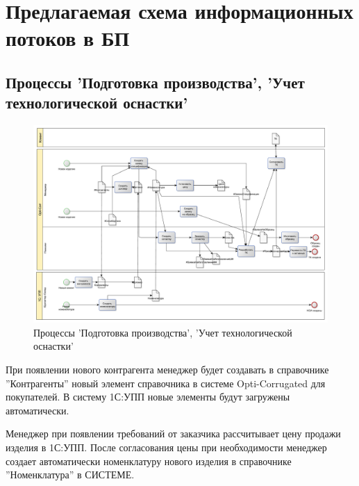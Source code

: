 



%
\newpage
\section{Предлагаемая схема информационных потоков в БП}

\subsection{Процессы 'Подготовка производства', 'Учет технологической оснастки'}
\begin{figure}
\begin{center}
  \includegraphics[angle=90, height=0.9\textheight, keepaspectratio]{Pics/1_Новые изделия.pdf}
\end{center}
  \caption{Процессы 'Подготовка производства', 'Учет технологической оснастки'}
  \label{pic:Schema_1}
\end{figure}
\clearpage

При появлении нового контрагента менеджер будет создавать в справочнике ''Контрагенты'' новый элемент справочника в системе Opti-Corrugated для покупателей. В систему 1С:УПП новые элементы будут загружены автоматически.



Менеджер при появлении требований от заказчика рассчитывает цену продажи изделия в 1С:УПП. После согласования цены при необходимости менеджер создает автоматически номенклатуру нового изделия в справочнике ''Номенклатура'' в СИСТЕМЕ. 


